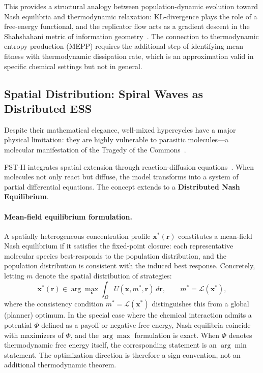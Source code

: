 \documentclass[12pt,a4paper]{article}
\theoremstyle{remark}
\begin{document}
This provides a structural analogy between population-dynamic evolution toward Nash equilibria and thermodynamic relaxation: KL-divergence plays the role of a free-energy functional, and the replicator flow acts as a gradient descent in the Shahshahani metric of information geometry~\citep{ReplicatorEntropy}. The connection to thermodynamic entropy production (MEPP) requires the additional step of identifying mean fitness with thermodynamic dissipation rate, which is an approximation valid in specific chemical settings but not in general.

\subsection{Spatial Distribution: Spiral Waves as Distributed ESS}

Despite their mathematical elegance, well-mixed hypercycles have a major physical limitation: they are highly vulnerable to parasitic molecules---a molecular manifestation of the Tragedy of the Commons~\citep{HypercycleInfinite}.

FST-II integrates spatial extension through reaction-diffusion equations~\citep{ReplicatorDiffusion}. When molecules not only react but diffuse, the model transforms into a system of partial differential equations. The concept extends to a \textbf{Distributed Nash Equilibrium}.

\paragraph{Mean-field equilibrium formulation.}
A spatially heterogeneous concentration profile $\mathbf{x}^*(\mathbf{r})$ constitutes a mean-field Nash equilibrium if it satisfies the fixed-point closure: each representative molecular species best-responds to the population distribution, and the population distribution is consistent with the induced best response. Concretely, letting $m$ denote the spatial distribution of strategies:
\begin{equation}
\mathbf{x}^*(\mathbf{r}) \in \arg\max_{\mathbf{x}} \int_\Omega U(\mathbf{x}, m^*, \mathbf{r}) \, d\mathbf{r}, \qquad m^* = \mathcal{L}(\mathbf{x}^*),
\end{equation}
where the consistency condition $m^* = \mathcal{L}(\mathbf{x}^*)$ distinguishes this from a global (planner) optimum. In the special case where the chemical interaction admits a potential $\Phi$ defined as a payoff or negative free energy, Nash equilibria coincide with maximizers of $\Phi$, and the $\arg\max$ formulation is exact. When $\Phi$ denotes thermodynamic free energy itself, the corresponding statement is an $\arg\min$ statement. The optimization direction is therefore a sign convention, not an additional thermodynamic theorem.
\end{document}
